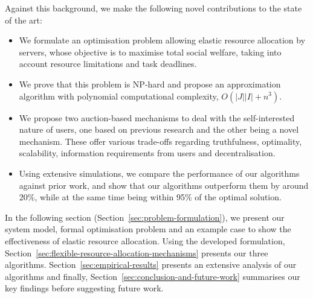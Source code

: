 Against this background, we make the following novel contributions to the state of the art:
\begin{itemize}
    \item We formulate an optimisation problem allowing elastic resource allocation by servers, whose objective is to maximise total social welfare, taking into account resource limitations and task deadlines.
    \item We prove that this problem is NP-hard and propose an approximation algorithm with polynomial computational complexity, $O(\left|J\right| \left|I\right| + n^3)$.
    \item We propose two auction-based mechanisms to deal with the self-interested nature of users, one based on previous research and the other being a novel mechanism. These offer various trade-offs regarding truthfulness, optimality, scalability, information requirements from users and decentralisation.
    \item Using extensive simulations, we compare the performance of our algorithms against prior work, and show that our algorithms outperform them by around 20\%, while at the same time being within 95\% of the optimal solution.
\end{itemize}

In the following section (Section~\ref{sec:problem-formulation}), we present our system model, formal optimisation problem and an example case to show the effectiveness of elastic resource allocation. Using the developed formulation, Section~\ref{sec:flexible-resource-allocation-mechanisms} presents our three algorithms. Section~\ref{sec:empirical-results} presents an extensive analysis of our algorithms and finally, Section~\ref{sec:conclusion-and-future-work} summarises our key findings before suggesting future work. 